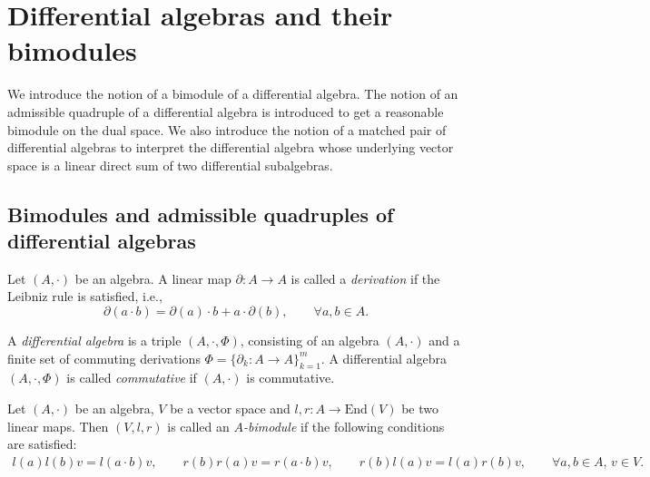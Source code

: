 \documentclass[10pt,a4paper]{amsart}
\numberwithin{equation}{section}
\newcommand{\End}{\mathrm{End}}
\begin{document}
\section{Differential algebras and their bimodules}\label{sec:rep}

We introduce the notion of a bimodule of a differential algebra.
The notion of an admissible quadruple of a differential algebra is introduced to get a reasonable bimodule on the dual space.
We also introduce the notion of a matched pair of differential algebras to interpret the differential algebra whose underlying vector space is a linear direct sum of two differential subalgebras.

\subsection{Bimodules and admissible quadruples of differential algebras}

\begin{Definition}\label{def:derivation}
 Let $(A, \cdot)$ be an algebra.
 A linear map $\partial\colon A \to A$ is called a \textit{derivation}
 if the Leibniz rule is satisfied, i.e.,
 \begin{equation}
 \partial(a \cdot b) = \partial(a) \cdot b + a \cdot \partial(b), \qquad
 \forall a, b \in A. \label{eq:derivation}
 \end{equation}
\end{Definition}

\begin{Definition}\label{def:dalg}
 A \textit{differential algebra} is a triple $(A, \cdot, \Phi)$,
 consisting of an algebra $(A, \cdot)$ and a finite set of commuting derivations $\Phi = \{\partial_k\colon A \to A\}^m_{k=1}$.
 A differential algebra $(A, \cdot, \Phi)$ is called \textit{commutative} if $(A, \cdot)$ is commutative.
\end{Definition}

\begin{Definition} Let $(A, \cdot)$ be an algebra, $V$ be a vector space and $l, r\colon A \to \End (V)$ be two linear maps.
 Then $(V, l, r)$ is called an \textit{$A$-bimodule} if the following conditions are satisfied:
 \begin{gather*}
 l(a)l(b)v = l(a \cdot b) v, \qquad\!\!\!
 r(b)r(a)v = r(a \cdot b) v, \qquad\!\!\!
 r(b)l(a)v = l(a)r(b) v, \qquad\!\!\!
 \forall a, b \in A, \, v \in V.\!
 \end{gather*}
\end{Definition}
\end{document}
